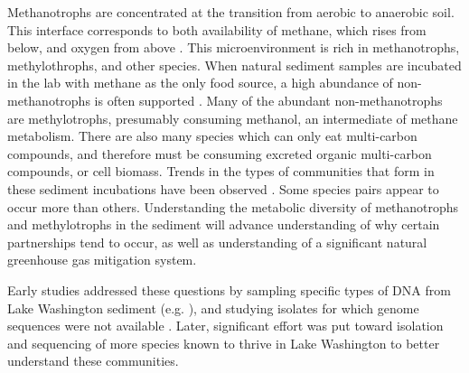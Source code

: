Methanotrophs are concentrated at the transition from aerobic to anaerobic soil.
This interface corresponds to both availability of methane, which rises from below, and oxygen from above \cite{lidstrom1984gradients, kuivilal1988, auman2000gradients}. %
This microenvironment is rich in methanotrophs, methylothrophs, and other species.
When natural sediment samples are incubated in the lab with methane as the only food source, a high abundance of non-methanotrophs is often supported \cite{oshkin2015LW}.
Many of the abundant non-methanotrophs are methylotrophs, presumably consuming methanol, an intermediate of methane metabolism.
There are also many species which can only eat multi-carbon compounds, and therefore must be consuming excreted organic multi-carbon compounds, or cell biomass.
Trends in the types of communities that form in these sediment incubations have been observed  \cite{oshkin2015LW}.
Some species pairs appear to occur more than others.
Understanding the metabolic diversity of methanotrophs and methylotrophs in the sediment will advance understanding of why certain partnerships tend to occur, as well as understanding of a significant natural greenhouse gas mitigation system.

Early studies addressed these questions by sampling specific types of DNA from Lake Washington sediment (e.g. \cite{auman2002, costello2002, nercessian2005}), and studying isolates for which genome sequences were not available \cite{auman2000gradients, kalyuzhnaya2005Methylosarcina, kalyuzhnaya2006methylotenera}.
Later, significant effort was put toward isolation and sequencing of more species known to thrive in Lake Washington
    \cite{kalyuzhnaya2011isolates, beck2015isolates, mctaggart2015, kalyuzhnaya2015} to better understand these communities.

